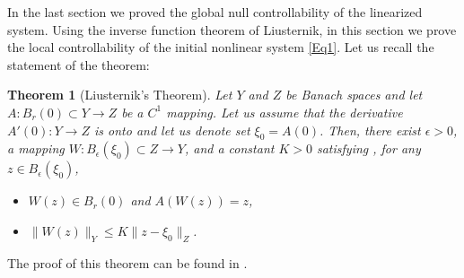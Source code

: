 \documentclass[11pt,a4paper]{amsart}
\numberwithin{equation}{section}
\newtheorem{theorem}{Theorem}[section]
\begin{document}
In the last section we proved the global null controllability of the linearized system. Using the inverse function theorem of Liusternik, in this section we prove the local controllability of the initial nonlinear system \eqref{Eq1}. Let us recall the statement of the theorem:

\begin{theorem}[Liusternik's Theorem]
    Let $Y$ and $Z$ be Banach spaces and let $A : B_r(0) \subset Y \rightarrow Z$ be a $C^1$ mapping. Let us assume that the derivative $A'(0) : Y \rightarrow Z$ is onto and let us denote set $\xi_0 = A(0)$. Then, there exist $\epsilon>0$, a mapping $W : B_\epsilon(\xi_0) \subset Z \rightarrow Y$, and a constant $K > 0$ satisfying , for any $z \in  B_\epsilon(\xi_0)$, 
    \begin{itemize}
        \item $W(z) \in B_r(0)$ and $A(W (z)) = z$,
        \item $\parallel W(z)\parallel_Y \leq K\parallel z - \xi_0 \parallel_Z$.
    \end{itemize}
\end{theorem}
The proof of this theorem can be found in \cite{Alekseev}.
\end{document}
